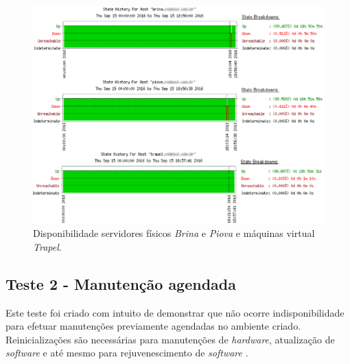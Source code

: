 \begin{figure}[h!]
 \centering
 \includegraphics[width=470px]{img/teste1_disponibilidade.eps}
 \caption{Disponibilidade servidores físicos \textit{Brina} e \textit{Piova} e máquinas virtual \textit{Trapel}.}
 \label{fig:teste1_disponibilidade}
\end{figure}


\subsection{Teste 2 - Manutenção agendada}

Este teste foi criado com intuito de demonstrar que não ocorre indisponibilidade para efetuar manutenções previamente agendadas no ambiente criado.
Reinicializações são necessárias para manutenções de \textit{hardware}, atualização de \textit{software} e até mesmo para rejuvenescimento de
\textit{software} \cite{melo2014}.


